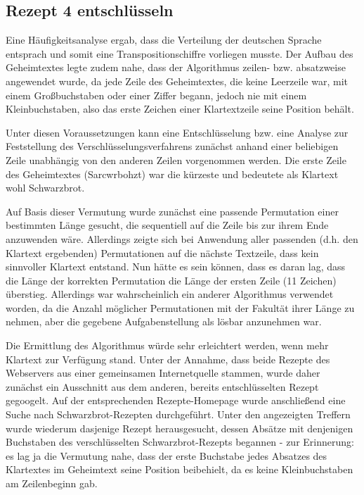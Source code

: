 \subsection{Rezept 4 entschlüsseln}
\label{RezeptVierEntschluesseln}

Eine Häufigkeitsanalyse ergab, dass die Verteilung der deutschen Sprache
entsprach und somit eine Transpositionschiffre vorliegen musste. Der Aufbau des
Geheimtextes legte zudem nahe, dass der Algorithmus zeilen- bzw. absatzweise
angewendet wurde, da jede Zeile des Geheimtextes, die keine Leerzeile war, mit
einem Großbuchstaben oder einer Ziffer begann, jedoch nie mit einem
Kleinbuchstaben, also das erste Zeichen einer Klartextzeile seine Position
behält.

Unter diesen Voraussetzungen kann eine Entschlüsselung bzw. eine Analyse zur
Feststellung des Verschlüsselungsverfahrens zunächst anhand einer beliebigen
Zeile unabhängig von den anderen Zeilen vorgenommen werden. Die erste Zeile des
Geheimtextes (\glqq{}Sarcwrbohzt\grqq{}) war die kürzeste und bedeutete als Klartext wohl
\glqq{}Schwarzbrot\grqq{}.

Auf Basis dieser Vermutung wurde zunächst eine passende Permutation einer
bestimmten Länge gesucht, die sequentiell auf die Zeile bis zur ihrem Ende
anzuwenden wäre. Allerdings zeigte sich bei Anwendung aller passenden (d.h. den
Klartext ergebenden) Permutationen auf die nächste Textzeile, dass kein
sinnvoller Klartext entstand. Nun hätte es sein können, dass es daran lag, dass
die Länge der korrekten Permutation die Länge der ersten Zeile (11 Zeichen)
überstieg. Allerdings war wahrscheinlich ein anderer Algorithmus verwendet
worden, da die Anzahl möglicher Permutationen mit der Fakultät ihrer Länge
zu nehmen, aber die gegebene Aufgabenstellung als lösbar anzunehmen war.

Die Ermittlung des Algorithmus würde sehr erleichtert werden, wenn mehr Klartext
zur Verfügung stand. Unter der Annahme, dass beide Rezepte des Webservers aus
einer gemeinsamen Internetquelle stammen, wurde daher zunächst ein Ausschnitt
aus dem anderen, bereits entschlüsselten Rezept gegoogelt. Auf der
entsprechenden Rezepte-Homepage wurde anschließend eine Suche nach
Schwarzbrot-Rezepten durchgeführt. Unter den angezeigten Treffern wurde wiederum
dasjenige Rezept herausgesucht, dessen Absätze mit denjenigen Buchstaben des
verschlüsselten Schwarzbrot-Rezepts begannen - zur Erinnerung: es lag ja die
Vermutung nahe, dass der erste Buchstabe jedes Absatzes des Klartextes im
Geheimtext seine Position beibehielt, da es keine Kleinbuchstaben am
Zeilenbeginn gab.

